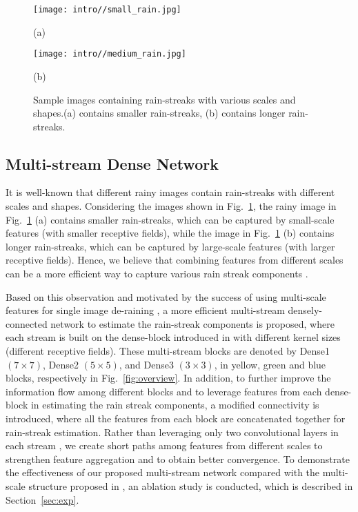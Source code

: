 \documentclass[10pt,twocolumn,letterpaper]{article}
\begin{document}
\begin{figure}[t]
	\centering
	\begin{minipage}{.23\textwidth}
		\centering
		\texttt{[image: intro//small\_rain.jpg]}
		\captionsetup{labelformat=empty}
		\captionsetup{justification=centering}
		\caption*{(a)}
\end{minipage}
	\begin{minipage}{.23\textwidth}
		\centering
		\texttt{[image: intro//medium\_rain.jpg]}
		\captionsetup{labelformat=empty}
		\captionsetup{justification=centering}
    	\caption*{(b)}
\end{minipage}	
		\vskip-10pt \caption{Sample images containing rain-streaks with various scales and shapes.(a) contains smaller rain-streaks, (b) contains longer rain-streaks.} \label{fig:moti_scale}
\end{figure} 


\subsection{Multi-stream Dense Network}
It is well-known that different rainy images contain rain-streaks with different scales and shapes.   Considering the images shown in Fig.~\ref{fig:moti_scale},    the rainy image in Fig.~\ref{fig:moti_scale} (a) contains smaller rain-streaks, which can be captured by small-scale features (with smaller receptive fields), while the image in Fig.~\ref{fig:moti_scale} (b) contains longer rain-streaks, which can be captured by large-scale features (with larger receptive fields).  Hence, we believe that  combining features from different scales can be a more efficient way to capture various rain streak components \cite{derain_context,derain_cvpr2017_multi}.

Based on this observation and motivated by the success of using multi-scale features for single image de-raining \cite{derain_cvpr2017_multi},  a more efficient multi-stream  densely-connected network to estimate the rain-streak components is proposed, where each stream is built on the dense-block introduced in \cite{dense_net} with different kernel sizes (different receptive fields).   These multi-stream blocks are denoted by Dense1 $(7\times7)$, Dense2 $(5\times5)$, and Dense3 $(3\times3)$, in yellow, green and blue blocks, respectively in Fig.~\ref{fig:overview}.   In addition, to further improve the information flow among different blocks and to leverage features from each dense-block in estimating the rain streak components,  a modified connectivity is introduced, where all the features from each block are concatenated together for rain-streak estimation. Rather than leveraging only two convolutional layers in each stream \cite{derain_cvpr2017_multi}, we create short paths among features from different scales to strengthen feature aggregation and to obtain better convergence. To demonstrate the effectiveness of  our proposed  multi-stream network compared with the multi-scale structure proposed in \cite{derain_cvpr2017_multi},  an ablation study is conducted, which is described in Section~\ref{sec:exp}. 
\end{document}
